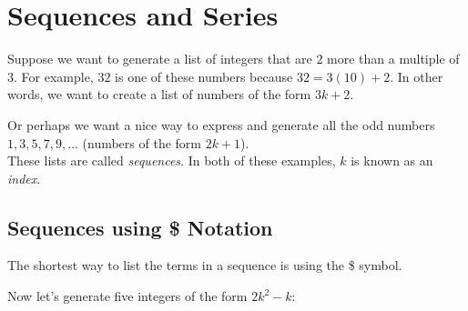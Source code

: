 \chapter{Sequences and Series}
\label{chp:sequence_and_sseries}			

Suppose we want to generate a list of integers that are $2$ more than a multiple of $3$. For example, $32$ is one of these numbers because $32 = 3(10)+2$. In other words, we want to create a list of numbers of the form $3k+2$. \\


Or perhaps we want a nice way to express and generate all the odd numbers $1,3,5,7,9,\ldots$ (numbers of the form $2k+1$).\\

These lists are called \textit{sequences}. In both of these examples, $k$ is known as an \textit{index}.

\section{Sequences using \$ Notation}
\label{sec:sequences_using_dollar_notation}

The shortest way to list the terms in a sequence is using the \$ symbol. 

\begin{maplegroup}
\begin{mapleinput}
\end{mapleinput}
\mapleresult
\begin{maplelatex}
\end{maplelatex}
\end{maplegroup}

\noindent Now let's generate five integers of the form $2k^2-k$:

\begin{maplegroup}
\begin{mapleinput}
\end{mapleinput}
\mapleresult
\begin{maplelatex}
\end{maplelatex}
\end{maplegroup}

